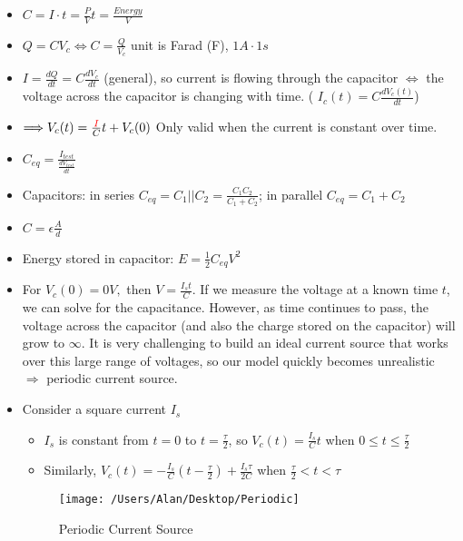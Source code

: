 \documentclass{article}
\begin{document}
\pagebreak
{}
\begin{itemize}
	\item $C = I\cdot t = \frac{P}{V}t = \frac{Energy}{V}$
	\item $Q = CV_c\iff C = \frac{Q}{V_c}$ unit is Farad (F), $1A\cdot 1s$
	\item $I = \frac{dQ}{dt} = C\frac{dV_c}{dt}$ (general), so current is flowing through the capacitor $\iff$ the voltage across the capacitor is changing with time. ({\color{red} $I_c(t) = C\frac{dV_c(t)}{dt}$})
	\item $\Longrightarrow V_c(t) = \frac{{\color{red} I}}{C}t + V_c(0)$ Only valid when the current is constant over time.
	\item $C_{eq} = \frac{I_{test}}{\frac{dV_{test}}{dt}}$
	\item Capacitors: {\color{red} in series} $C_{eq} = C_1||C_2 = \frac{C_1C_2}{C_1+C_2}$; in parallel $C_{eq} = C_1+C_2$
	\item {\color{red} $C = \epsilon\frac{A}{d}$}
	\item Energy stored in capacitor: $E = \frac{1}{2} C_{eq}V^2$
	\item For $V_c(0) = 0V,$ then $V = \frac{I_st}{C}$.	If we measure the voltage at a known time $t$, we can solve for the capacitance. However, as time continues to pass, the voltage across the capacitor (and also the charge stored on the capacitor) will grow to $\infty$. It is very challenging to build an ideal current source that works over this large range of voltages, so our model quickly becomes unrealistic $\Longrightarrow$ periodic current source.
	\item Consider a square current $I_s$
	\begin{itemize}
		\item $I_s$ is constant from $t=0$ to $t = \frac{\tau}{2}$, so $V_c(t) = \frac{I_s}{C}t$ when $0\leq t\leq\frac{\tau}{2}$
		\item Similarly, $V_c(t) = -\frac{I_s}{C}(t-\frac{\tau}{2}) + \frac{I_s\tau}{2C}$ when $\frac{\tau}{2}<t<\tau$
	\end{itemize}

\begin{figure} [h!]
	\begin{center}
	\texttt{[image: /Users/Alan/Desktop/Periodic]}
	\caption{Periodic Current Source}
	\label{fig}
	\end{center}
\end{figure}

\end{itemize}
\end{document}
